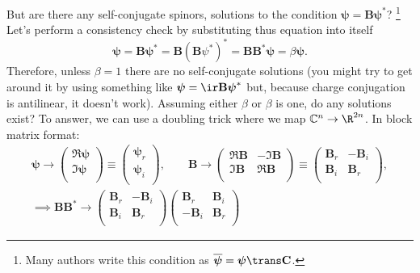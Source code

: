 \documentclass[11pt]{article}
\newcommand{\B}{\mathbf{B}}
\renewcommand{\C}{\mathbf{C}}
\newcommand{\Cb}{\mathbb{C}}
\newcommand{\psib}{\boldsymbol{\psi}}
\begin{document}
But are there any self-conjugate spinors, \ie solutions to the condition \( \psib = \B \psib^\ast \)?%
\footnote{Many authors write this condition as \( \overline{\psib} = \psib\trans \C \).}
Let's perform a consistency  check by substituting thus equation into itself
%
\begin{equation*}
  \psib = \B \psib^\ast = \B (\B \psi^\ast)^\ast = \B \B^\ast \psib = \beta \psib.
\end{equation*}
%
Therefore, unless $\beta = 1$ there are no self-conjugate solutions
(you might try to get around it by using something like \( \psib = \ir \B \psib^\ast \) but, because charge conjugation is antilinear, it doesn't work).
Assuming either $\beta$ or $\beta$ is one, do any solutions exist?
To answer, we can use a doubling trick where we map $\Cb^n \to \R^{2n}$.
In block matrix format:
%
\begin{equation*}
\begin{gathered}
  \psib \to \begin{pmatrix}
              \Re \psib \\
              \Im \psib \\
            \end{pmatrix}
  \equiv    \begin{pmatrix}
              \psib_r \\
              \psib_i \\
            \end{pmatrix}
  , \qquad
  \B \to \begin{pmatrix}
           \Re \B & -\Im \B \\
           \Im \B &  \Re \B \\
         \end{pmatrix}
  \equiv \begin{pmatrix}
           \B_r & -\B_i \\
           \B_i &  \B_r \\
         \end{pmatrix}
  , \\
  \implies
  \B \B^\ast \to
         \begin{pmatrix}
           \B_r & -\B_i \\
           \B_i &  \B_r \\
         \end{pmatrix}
         \begin{pmatrix}
            \B_r & \B_i \\
           -\B_i & \B_r \\

\end{pmatrix}
\end{gathered}
\end{equation*}
\end{document}
